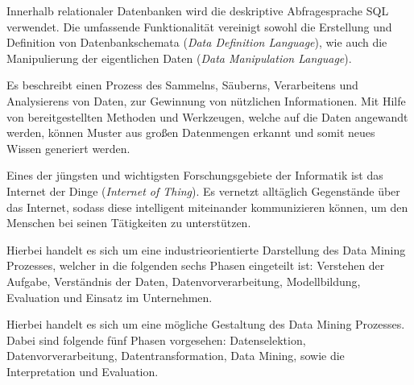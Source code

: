 %
{}%
{Innerhalb relationaler Datenbanken wird die deskriptive Abfragesprache SQL verwendet. Die umfassende Funktionalität vereinigt sowohl die Erstellung und Definition von Datenbankschemata (\textit{Data Definition Language}), wie auch die Manipulierung der eigentlichen Daten (\textit{Data Manipulation Language}).}


%
{}%
{Es beschreibt einen Prozess des \glqq Sammelns, Säuberns, Verarbeitens und Analysierens von Daten, zur Gewinnung von nützlichen Informationen.\grqq{} Mit Hilfe von bereitgestellten Methoden und Werkzeugen, welche auf die Daten angewandt werden, können Muster aus großen Datenmengen erkannt und somit neues Wissen generiert werden.}

%
{}%
{Eines der jüngsten und wichtigsten Forschungsgebiete der Informatik ist das Internet der Dinge (\textit{Internet of Thing}). Es vernetzt alltäglich Gegenstände über das Internet, sodass diese intelligent miteinander kommunizieren können, um den Menschen bei seinen Tätigkeiten zu unterstützen.}

%
{}%
{Hierbei handelt es sich um eine industrieorientierte Darstellung des Data Mining Prozesses, welcher in die folgenden sechs Phasen eingeteilt ist: Verstehen der Aufgabe, Verständnis der Daten, Datenvorverarbeitung, Modellbildung, Evaluation und Einsatz im Unternehmen.}

%
{}%
{Hierbei handelt es sich um eine mögliche Gestaltung des Data Mining Prozesses. Dabei sind folgende fünf Phasen vorgesehen: Datenselektion, Datenvorverarbeitung, Datentransformation, Data Mining, sowie die Interpretation und Evaluation.}



